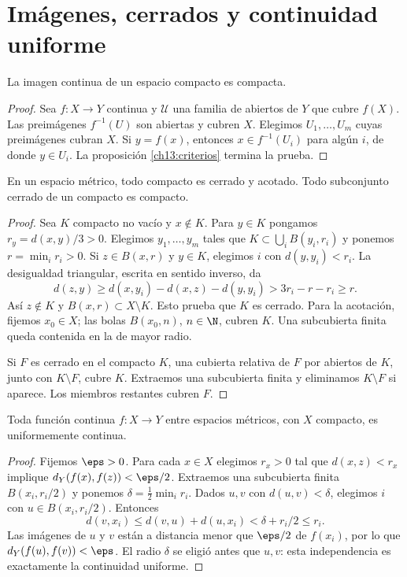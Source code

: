 \section{Imágenes, cerrados y continuidad uniforme}
\begin{teorema}\label{ch13:imagen}
La imagen continua de un espacio compacto es compacta.
\end{teorema}
\begin{proof}
Sea $f:X\to Y$ continua y $\mathcal U$ una familia de abiertos de $Y$ que cubre $f(X)$. Las preimágenes $f^{-1}(U)$ son abiertas y cubren $X$. Elegimos $U_1,\ldots,U_m$ cuyas preimágenes cubran $X$. Si $y=f(x)$, entonces $x\in f^{-1}(U_i)$ para algún $i$, de donde $y\in U_i$. La proposición \ref{ch13:criterios} termina la prueba.
\end{proof}

\begin{proposicion}\label{ch13:cerrados}
En un espacio métrico, todo compacto es cerrado y acotado. Todo subconjunto cerrado de un compacto es compacto.
\end{proposicion}
\begin{proof}
Sea $K$ compacto no vacío y $x\notin K$. Para $y\in K$ pongamos $r_y=d(x,y)/3>0$. Elegimos $y_1,\ldots,y_m$ tales que $K\subset\bigcup_iB(y_i,r_i)$ y ponemos $r=\min_i r_i>0$. Si $z\in B(x,r)$ y $y\in K$, elegimos $i$ con $d(y,y_i)<r_i$. La desigualdad triangular, escrita en sentido inverso, da
\[
d(z,y)\ge d(x,y_i)-d(x,z)-d(y,y_i)>3r_i-r-r_i\ge r.
\]
Así $z\notin K$ y $B(x,r)\subset X\setminus K$. Esto prueba que $K$ es cerrado. Para la acotación, fijemos $x_0\in X$; las bolas $B(x_0,n)$, $n\in\N$, cubren $K$. Una subcubierta finita queda contenida en la de mayor radio.

Si $F$ es cerrado en el compacto $K$, una cubierta relativa de $F$ por abiertos de $K$, junto con $K\setminus F$, cubre $K$. Extraemos una subcubierta finita y eliminamos $K\setminus F$ si aparece. Los miembros restantes cubren $F$.
\end{proof}

\begin{teorema}\label{ch13:heinecantor}
Toda función continua $f:X\to Y$ entre espacios métricos, con $X$ compacto, es uniformemente continua.
\end{teorema}
\begin{proof}
Fijemos $\eps>0$. Para cada $x\in X$ elegimos $r_x>0$ tal que $d(x,z)<r_x$ implique $d_Y(f(x),f(z))<\eps/2$. Extraemos una subcubierta finita $B(x_i,r_i/2)$ y ponemos $\delta=\frac12\min_i r_i$. Dados $u,v$ con $d(u,v)<\delta$, elegimos $i$ con $u\in B(x_i,r_i/2)$. Entonces
\[
d(v,x_i)\le d(v,u)+d(u,x_i)<\delta+r_i/2\le r_i.
\]
Las imágenes de $u$ y $v$ están a distancia menor que $\eps/2$ de $f(x_i)$, por lo que $d_Y(f(u),f(v))<\eps$. El radio $\delta$ se eligió antes que $u,v$: esta independencia es exactamente la continuidad uniforme.
\end{proof}

